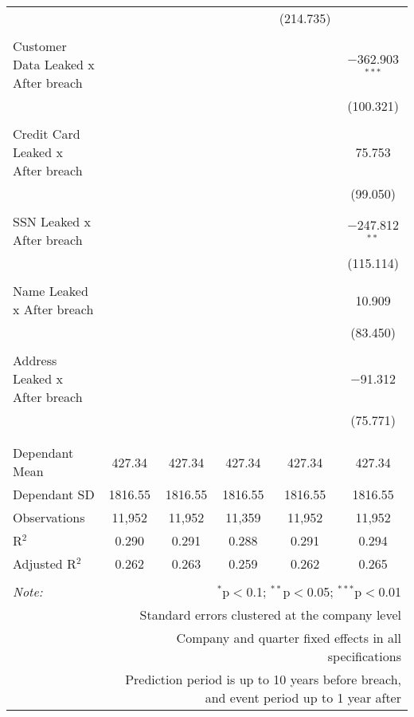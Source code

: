 \begin{table}[!htbp]
\begin{tabular}{@{\extracolsep{5pt}}lccccc}
  &  &  &  & (214.735) &  \\ 
  & & & & & \\ 
 Customer Data Leaked x After breach &  &  &  &  & $-$362.903$^{***}$ \\ 
  &  &  &  &  & (100.321) \\ 
  & & & & & \\ 
 Credit Card Leaked x After breach &  &  &  &  & 75.753 \\ 
  &  &  &  &  & (99.050) \\ 
  & & & & & \\ 
 SSN Leaked x After breach &  &  &  &  & $-$247.812$^{**}$ \\ 
  &  &  &  &  & (115.114) \\ 
  & & & & & \\ 
 Name Leaked x After breach &  &  &  &  & 10.909 \\ 
  &  &  &  &  & (83.450) \\ 
  & & & & & \\ 
 Address Leaked x After breach &  &  &  &  & $-$91.312 \\ 
  &  &  &  &  & (75.771) \\ 
  & & & & & \\ 
\hline \\[-1.8ex] 
Dependant Mean & 427.34 & 427.34 & 427.34 & 427.34 & 427.34 \\ 
Dependant SD & 1816.55 & 1816.55 & 1816.55 & 1816.55 & 1816.55 \\ 
Observations & 11,952 & 11,952 & 11,359 & 11,952 & 11,952 \\ 
R$^{2}$ & 0.290 & 0.291 & 0.288 & 0.291 & 0.294 \\ 
Adjusted R$^{2}$ & 0.262 & 0.263 & 0.259 & 0.262 & 0.265 \\ 
\hline 
\hline \\[-1.8ex] 
\textit{Note:}  & \multicolumn{5}{r}{$^{*}$p$<$0.1; $^{**}$p$<$0.05; $^{***}$p$<$0.01} \\ 
 & \multicolumn{5}{r}{Standard errors clustered at the company level} \\ 
 & \multicolumn{5}{r}{Company and quarter fixed effects in all specifications} \\ 
 & \multicolumn{5}{r}{Prediction period is up to 10 years before breach, and event period up to 1 year after} \\ 
\end{tabular} 
\end{table} 
